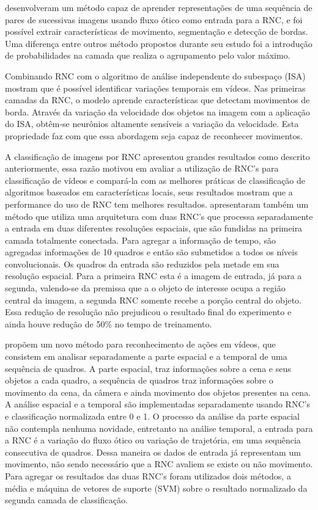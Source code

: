 \documentclass[
	12pt,				%
    oneside,			%
	a4paper,			%
	english,			%
	french,				%
	spanish,			%
	brazil,				%
	]{abntex2}
\begin{document}
 desenvolveram um método capaz de aprender representações de uma sequência de pares de sucessivas imagens usando fluxo ótico como entrada para a RNC, e foi possível extrair características de movimento, segmentação e detecção de bordas. Uma diferença entre outros método propostos durante seu estudo foi a introdução de probabilidades na camada que realiza o agrupamento pelo valor máximo. 

Combinando RNC com o algoritmo de análise independente do subespaço (ISA)  mostram que é possível identificar variações temporais em vídeos. Nas primeiras camadas da RNC, o modelo aprende características que detectam movimentos de borda. Através da variação da velocidade dos objetos na imagem com a aplicação do ISA, obtêm-se neurônios altamente sensíveis a variação da velocidade. Esta propriedade faz com que essa abordagem seja capaz de reconhecer movimentos.

A classificação de imagens por RNC apresentou grandes resultados como descrito anteriormente, essa razão motivou   em avaliar a utilização de RNC’s para classificação de vídeos e compará-la com as melhores práticas de classificação de algoritmos baseados em características locais, seus resultados mostram que a performance do uso de RNC tem melhores resultados.  apresentaram também um método que utiliza uma arquitetura com duas RNC’s que processa separadamente a entrada em duas diferentes resoluções espaciais, que são fundidas na primeira camada totalmente conectada. Para agregar a informação de tempo, são agregadas informações de 10 quadros e então são submetidos a todos os níveis convolucionais. Os quadros da entrada são reduzidos pela metade em sua resolução espacial. Para a primeira RNC esta é a imagem de entrada, já para a segunda, valendo-se da premissa que a o objeto de interesse ocupa a região central da imagem, a segunda RNC somente recebe a porção central do objeto. Essa redução de resolução não prejudicou o resultado final do experimento e ainda houve redução de 50\% no tempo de treinamento. 

 propõem um novo método para reconhecimento de ações em vídeos, que consistem em analisar separadamente a parte espacial e a temporal de uma sequência de quadros. A parte espacial, traz informações sobre a cena e seus objetos a cada quadro, a sequência de quadros traz informações sobre o movimento da cena, da câmera e ainda movimento dos objetos presentes na cena. A análise espacial e a temporal são implementadas separadamente usando RNC’s e classificação normalizada entre 0 e 1. O processo da análise da parte espacial não contempla nenhuma novidade, entretanto na análise temporal, a entrada para a RNC é a variação do fluxo ótico ou variação de trajetória, em uma sequência consecutiva de quadros. Dessa maneira os dados de entrada já representam um movimento, não sendo necessário que a RNC avaliem se existe ou não movimento. Para agregar os resultados das duas RNC’s foram utilizados dois métodos, a média e máquina de vetores de suporte (SVM) sobre o resultado normalizado da segunda camada de classificação.
\end{document}
